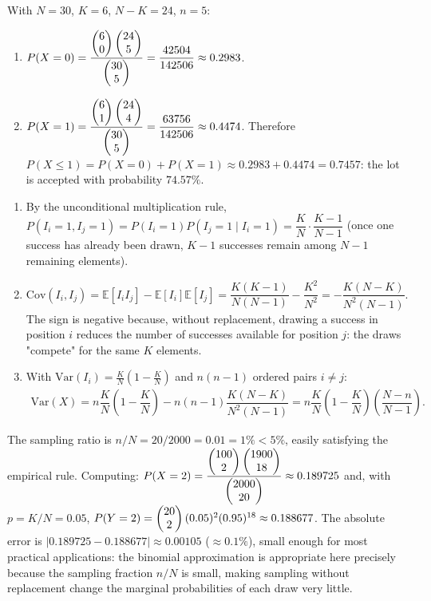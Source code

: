 \begin{solproblema}[prob:1651c98]
	With $N=30$, $K=6$, $N-K=24$, $n=5$:
	\begin{enumerate}
		\item $P(X=0) = \dfrac{\begin{pmatrix} 6 \\ 0\end{pmatrix}\begin{pmatrix} 24 \\ 5\end{pmatrix}}{\begin{pmatrix} 30 \\ 5\end{pmatrix}} = \dfrac{42504}{142506} \approx 0.2983$.
		\item $P(X=1) = \dfrac{\begin{pmatrix} 6 \\ 1\end{pmatrix}\begin{pmatrix} 24 \\ 4\end{pmatrix}}{\begin{pmatrix} 30 \\ 5\end{pmatrix}} = \dfrac{63756}{142506} \approx 0.4474$. Therefore $P(X\le1) = P(X=0)+P(X=1) \approx 0.2983+0.4474 = 0.7457$: the lot is accepted with probability $74.57\%$.
	\end{enumerate}
\end{solproblema}

\begin{solproblema}[prob:64e9a8d]
	\begin{enumerate}
		\item By the unconditional multiplication rule, $P(I_i=1,I_j=1) = P(I_i=1)P(I_j=1\mid I_i=1) = \dfrac{K}{N}\cdot\dfrac{K-1}{N-1}$ (once one success has already been drawn, $K-1$ successes remain among $N-1$ remaining elements).
		\item $\text{Cov}(I_i,I_j) = \mathbb{E}[I_iI_j]-\mathbb{E}[I_i]\mathbb{E}[I_j] = \dfrac{K(K-1)}{N(N-1)}-\dfrac{K^2}{N^2} = -\dfrac{K(N-K)}{N^2(N-1)}$. The sign is negative because, without replacement, drawing a success in position $i$ reduces the number of successes available for position $j$: the draws "compete" for the same $K$ elements.
		\item With $\text{Var}(I_i)=\frac{K}{N}(1-\frac{K}{N})$ and $n(n-1)$ ordered pairs $i\neq j$:
		\begin{align*}
			\text{Var}(X) = n\dfrac{K}{N}\left(1-\dfrac{K}{N}\right) - n(n-1)\dfrac{K(N-K)}{N^2(N-1)} = n\dfrac{K}{N}\left(1-\dfrac{K}{N}\right)\left(\dfrac{N-n}{N-1}\right).
		\end{align*}
	\end{enumerate}
\end{solproblema}

\begin{solproblema}[prob:7cf587b]
	The sampling ratio is $n/N = 20/2000 = 0.01 = 1\% < 5\%$, easily satisfying the empirical rule. Computing: $P(X=2) = \dfrac{\begin{pmatrix} 100 \\ 2\end{pmatrix}\begin{pmatrix} 1900 \\ 18\end{pmatrix}}{\begin{pmatrix} 2000 \\ 20\end{pmatrix}} \approx 0.189725$ and, with $p=K/N=0.05$, $P(Y=2) = \begin{pmatrix} 20 \\ 2\end{pmatrix}(0.05)^2(0.95)^{18} \approx 0.188677$. The absolute error is $|0.189725-0.188677| \approx 0.00105$ ($\approx 0.1\%$), small enough for most practical applications: the binomial approximation is appropriate here precisely because the sampling fraction $n/N$ is small, making sampling without replacement change the marginal probabilities of each draw very little.
\end{solproblema}


